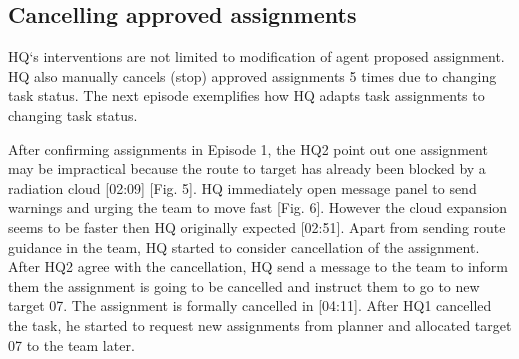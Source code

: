 \subsection{Cancelling approved assignments}
HQ`s interventions are not limited to modification of agent proposed assignment. HQ also manually cancels (stop) approved assignments 5 times due to changing task status.  The next episode exemplifies how HQ adapts task assignments to changing task status. \\

\noindent{} 
\hfill \break


After confirming assignments in Episode 1, the HQ2 point out one assignment may be impractical because the route to target has already been blocked by a radiation cloud [02:09] [Fig. 5]. HQ immediately open message panel to send warnings and urging the team to move fast [Fig. 6]. However the cloud expansion seems to be faster then HQ originally expected [02:51]. Apart from sending route guidance in the team, HQ started to consider cancellation of the assignment. After HQ2 agree with the cancellation, HQ send a message to the team to inform them the assignment is going to be cancelled and instruct them to go to new target 07. The assignment is formally cancelled in [04:11]. After HQ1 cancelled the task, he started to request new assignments from planner and allocated target 07 to the team later. \\


